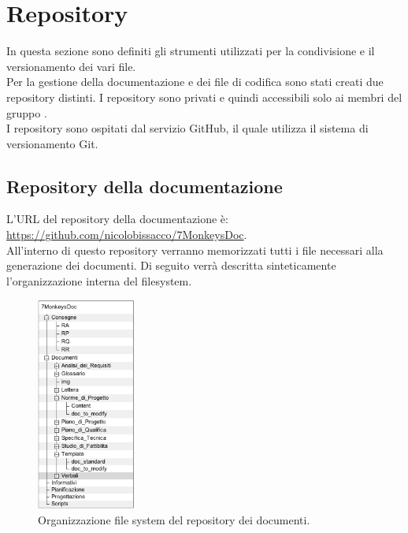 \section{Repository}
\label{repository}
In questa sezione sono definiti gli strumenti utilizzati per la condivisione e il versionamento dei vari file.
\\Per la gestione della documentazione e dei file di codifica sono stati creati due repository\glossario{} distinti. 
I repository\glossario{} sono privati e quindi accessibili solo ai membri del gruppo \authorName.
\\I repository\glossario{} sono ospitati dal servizio GitHub\glossario{}, il quale utilizza il sistema di versionamento Git\glossario{}.

\subsection{Repository della documentazione}
\label{rdocumentazione}
L'URL del repository\glossario{} della documentazione è: \url{https://github.com/nicolobissacco/7MonkeysDoc}.
\\All'interno di questo repository\glossario{} verranno memorizzati tutti i file necessari alla generazione dei documenti. Di seguito verrà descritta sinteticamente l'organizzazione interna del filesystem.

\begin{figure}[h!]
\centering
\includegraphics[height=7cm]{./content/Immagini/Filesystem.png}
\caption{Organizzazione file system del repository dei documenti.}
\label{filesystem}
\end{figure}

